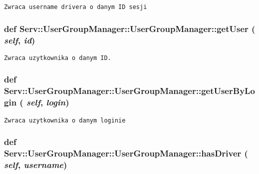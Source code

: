 \footnotesize\begin{verbatim}Zwraca username drivera o danym ID sesji\end{verbatim}
\normalsize
 \hypertarget{class_serv_1_1_user_group_manager_1_1_user_group_manager_94bccb5702d504f5b782ba2379aaaab4}{
\subsubsection[{getUser}]{\setlength{\rightskip}{0pt plus 5cm}def Serv::UserGroupManager::UserGroupManager::getUser ( {\em self}, \/   {\em id})}}
\label{class_serv_1_1_user_group_manager_1_1_user_group_manager_94bccb5702d504f5b782ba2379aaaab4}




\footnotesize\begin{verbatim}Zwraca uzytkownika o danym ID.\end{verbatim}
\normalsize
 \hypertarget{class_serv_1_1_user_group_manager_1_1_user_group_manager_ed20d08470748f78a641e6cc5700b505}{
\subsubsection[{getUserByLogin}]{\setlength{\rightskip}{0pt plus 5cm}def Serv::UserGroupManager::UserGroupManager::getUserByLogin ( {\em self}, \/   {\em login})}}
\label{class_serv_1_1_user_group_manager_1_1_user_group_manager_ed20d08470748f78a641e6cc5700b505}




\footnotesize\begin{verbatim}Zwraca uzytkownika o danym loginie\end{verbatim}
\normalsize
 \hypertarget{class_serv_1_1_user_group_manager_1_1_user_group_manager_39ae7245da0bcda25ce712d1b55f2f29}{
\subsubsection[{hasDriver}]{\setlength{\rightskip}{0pt plus 5cm}def Serv::UserGroupManager::UserGroupManager::hasDriver ( {\em self}, \/   {\em username})}}
\label{class_serv_1_1_user_group_manager_1_1_user_group_manager_39ae7245da0bcda25ce712d1b55f2f29}





